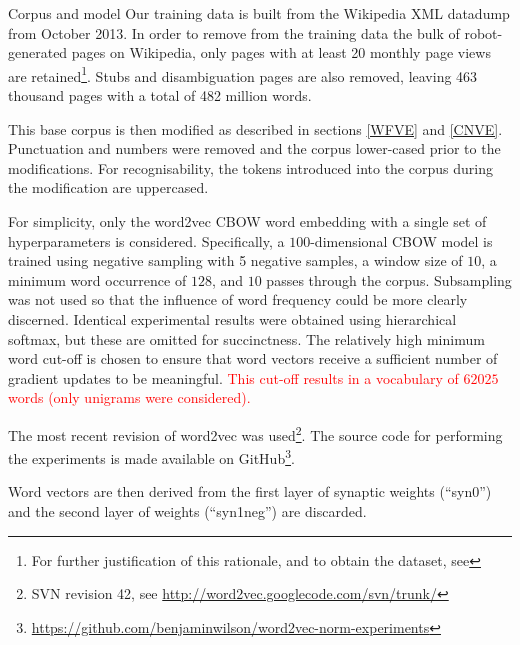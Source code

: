 \documentclass{article} %
\begin{document}
\begin{section}{Corpus and model}\label{corpus-and-model}
Our training data is built from the Wikipedia XML datadump from October 2013.
In order to remove from the training data the bulk of robot-generated pages on Wikipedia, only pages with at least 20 monthly page views are retained\footnote{For further justification of this rationale, and to obtain the dataset, see \blogpost}.
Stubs and disambiguation pages are also removed, leaving 463 thousand pages with a total of 482 million words.

This base corpus is then modified as described in sections \ref{WFVE} and \ref{CNVE}.
Punctuation and numbers were removed and the corpus lower-cased prior to the modifications.
For recognisability, the tokens introduced into the corpus during the modification are uppercased.

For simplicity, only the word2vec CBOW word embedding with a single set of hyperparameters is considered.
Specifically, a $100$-dimensional CBOW model is trained using negative sampling with 5 negative samples, a window size of $10$, a minimum word occurrence of $128$, and $10$ passes through the corpus.
Subsampling was not used so that the influence of word frequency could be more clearly discerned.
Identical experimental results were obtained using hierarchical softmax, but these are omitted for succinctness.
The relatively high minimum word cut-off is chosen to ensure that word vectors receive a sufficient number of gradient updates to be meaningful.
\textcolor{red}{This cut-off results in a vocabulary of $62025$ words (only unigrams were considered).}

The most recent revision of word2vec was used\footnote{SVN revision 42, see \url{http://word2vec.googlecode.com/svn/trunk/}}.
The source code for performing the experiments is made available on GitHub\footnote{\url{https://github.com/benjaminwilson/word2vec-norm-experiments}}.

Word vectors are then derived from the first layer of synaptic weights (``syn0'') and the second layer of weights (``syn1neg'') are discarded.



\end{section}
\end{document}
